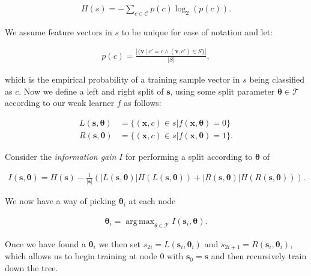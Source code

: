 \documentclass[12pt,twoside,notitlepage]{report}
\newcommand{\vc}[1]{\mathbf{#1}}
\newcommand{\cl}[1]{\mathcal{#1}}
\DeclareMathOperator*{\argmax}{arg\,max}
\begin{document}
            \begin{align}
                H(s) = - \sum_{c\in\cl{C}} p(c) \log_2 (p(c)).
                \label{eq:training_seq_entropy}
            \end{align}

            We assume feature vectors in $s$ to be unique for ease of notation and let:

            \begin{align}
                p(c) = \frac{\left| \{\vc{v}\ |\ c' = c \land (\vc{v},c') \in S \} \right|}{\left| S \right|},
                \label{eq:empirical_distribution}
            \end{align}
            
            which is the empirical probability of a training sample vector in $s$ being classified as $c$. Now we define 
            a left and right split of $\vc{s}$, using some split parameter $\vc{\theta} \in \cl{T}$ according to our weak 
            learner $f$ as follows:

            \begin{align}
                L(\vc{s},\vc{\theta}) & = \{ (\vc{x}, c) \in s | f(\vc{x}, \vc{\theta}) = 0 \}  \label{eq:left_split}\\
                R(\vc{s},\vc{\theta}) & = \{ (\vc{x}, c) \in s | f(\vc{x}, \vc{\theta}) = 1 \}. \label{eq:right_split}
            \end{align}

            Consider the \textit{information gain} $I$ for performing a split according to $\vc{\theta}$ of 

            \begin{align}
                I(\vc{s}, \vc{\theta}) = H(\vc{s}) - \frac{1}{|\vc{s}|} \left( |L(\vc{s}, \vc{\theta})| H(L(\vc{s}, \vc{\theta})) 
                                                                          + |R(\vc{s}, \vc{\theta})| H(R(\vc{s}, \vc{\theta})) \right).
                \label{eq:information_gain}
            \end{align} 

            We now have a way of picking $\vc{\theta}_i$ at each node

            \begin{align} 
                \vc{\theta}_i = \argmax_{\theta\in\cl{T}} I(\vc{s}_i, \vc{\theta}).
            \end{align} 

            Once we have found a $\vc{\theta}_i$ we then set $s_{2i} = L(\vc{s}_i, \vc{\theta}_i)$ and 
            $s_{2i+1} = R(\vc{s}_i, \vc{\theta}_i)$, which allows us to begin training at node $0$ with $\vc{s}_0 = \vc{s}$ 
            and then recursively train down the tree. \cite{criminisi2013decision}
\end{document}
